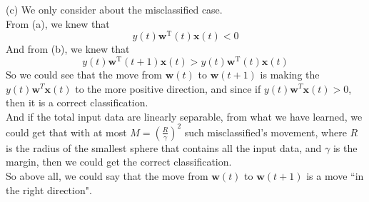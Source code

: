 \documentclass[10pt]{article}
\begin{document}
\begin{enumerate}[1.]
(c) We only consider about the misclassified case.\\
From (a), we knew that $$y(t) \mathbf{w}^{\mathrm{T}}(t) \mathbf{x}(t)<0$$
And from (b), we knew that $$y(t) \mathbf{w}^{\mathrm{T}}(t+1) \mathbf{x}(t)>y(t) \mathbf{w}^{\mathrm{T}}(t) \mathbf{x}(t)$$
So we could see that the move from $\mathbf{w}(t)$ to $\mathbf{w}(t+1)$ is making the $y(t)\mathbf{w}^T\mathbf{x}(t)$ to the more positive direction, 
and since if $y(t)\mathbf{w}^T\mathbf{x}(t)>0$, then it is a correct classification.\\ 
And if the total input data are linearly separable, from what we have learned, we could get that with 
at most $M=(\frac{R}{\gamma})^2$ such misclassified's movement, where $R$ is the radius of the smallest sphere that contains all the input data, and $\gamma$ is the margin,
then we could get the correct classification.\\

So above all, we could say that the move from $\mathbf{w}(t)$ to $\mathbf{w}(t+1)$ is a move ``in the right direction".

\end{enumerate}
\end{document}
